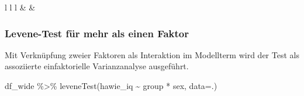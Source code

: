 \documentclass[
]{book}
\newenvironment{Shaded}{\begin{snugshade}}{\end{snugshade}}
\newcommand{\AttributeTok}[1]{\textcolor[rgb]{0.77,0.63,0.00}{#1}}
\newcommand{\FunctionTok}[1]{\textcolor[rgb]{0.00,0.00,0.00}{#1}}
\newcommand{\NormalTok}[1]{#1}
\newcommand{\SpecialCharTok}[1]{\textcolor[rgb]{0.00,0.00,0.00}{#1}}
\begin{document}
\begin{table}[ht]
\begin{centerbox}
\begin{threeparttable}
\begin{tabular}{l l l}
 &
 &
 \tabularnewline[-0.5pt]


\end{tabular}
\end{threeparttable}\par\end{centerbox}

\end{table}
 

\hypertarget{levene-test-fuxfcr-mehr-als-einen-faktor}{%
\subsubsection{Levene-Test für mehr als einen Faktor}\label{levene-test-fuxfcr-mehr-als-einen-faktor}}

Mit Verknüpfung zweier Faktoren als Interaktion im Modellterm wird der Test als assoziierte einfaktorielle Varianzanalyse ausgeführt.

\begin{Shaded}
\begin{Highlighting}[]
\NormalTok{df\_wide }\SpecialCharTok{\%\textgreater{}\%} 
  \FunctionTok{leveneTest}\NormalTok{(hawie\_iq }\SpecialCharTok{\textasciitilde{}}\NormalTok{ group }\SpecialCharTok{*}\NormalTok{ sex, }\AttributeTok{data=}\NormalTok{.)}
\end{Highlighting}
\end{Shaded}

 
  \providecommand{\huxb}[2]{\arrayrulecolor[RGB]{#1}\global\arrayrulewidth=#2pt}
  \providecommand{\huxvb}[2]{\color[RGB]{#1}\vrule width #2pt}
  \providecommand{\huxtpad}[1]{\rule{0pt}{#1}}
  \providecommand{\huxbpad}[1]{\rule[-#1]{0pt}{#1}}
\end{document}
